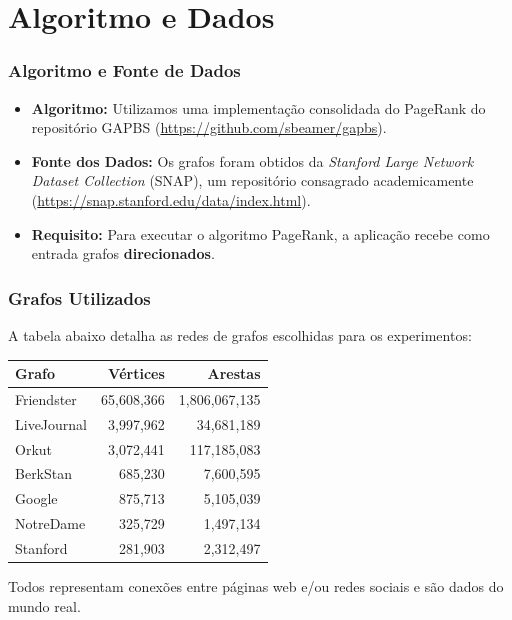 \documentclass{beamer}
\begin{document}
\section{Algoritmo e Dados}

\begin{frame}
    \frametitle{Algoritmo e Fonte de Dados}

    \begin{itemize}
        \item \textbf{Algoritmo:} Utilizamos uma implementação consolidada do PageRank do repositório GAPBS (\url{https://github.com/sbeamer/gapbs}).
        \item \textbf{Fonte dos Dados:} Os grafos foram obtidos da \textit{Stanford Large Network Dataset Collection} (SNAP), um repositório consagrado academicamente (\url{https://snap.stanford.edu/data/index.html}).
        \item \textbf{Requisito:} Para executar o algoritmo PageRank, a aplicação recebe como entrada grafos \textbf{direcionados}.
    \end{itemize}
\end{frame}

\begin{frame}
    \frametitle{Grafos Utilizados}

    A tabela abaixo detalha as redes de grafos escolhidas para os experimentos:

    \centering
    \begin{tabular}{lrr}
        \toprule
        \textbf{Grafo} & \textbf{Vértices} & \textbf{Arestas} \\
        \midrule
        Friendster     & 65,608,366        & 1,806,067,135    \\
        LiveJournal    & 3,997,962         & 34,681,189       \\
        Orkut          & 3,072,441         & 117,185,083      \\
        BerkStan       & 685,230           & 7,600,595        \\
        Google         & 875,713           & 5,105,039        \\
        NotreDame      & 325,729           & 1,497,134        \\
        Stanford       & 281,903           & 2,312,497        \\
        \bottomrule
    \end{tabular}

    \vspace{1em} %
    Todos representam conexões entre páginas web e/ou redes sociais e são dados do mundo real.

\end{frame}
\end{document}
